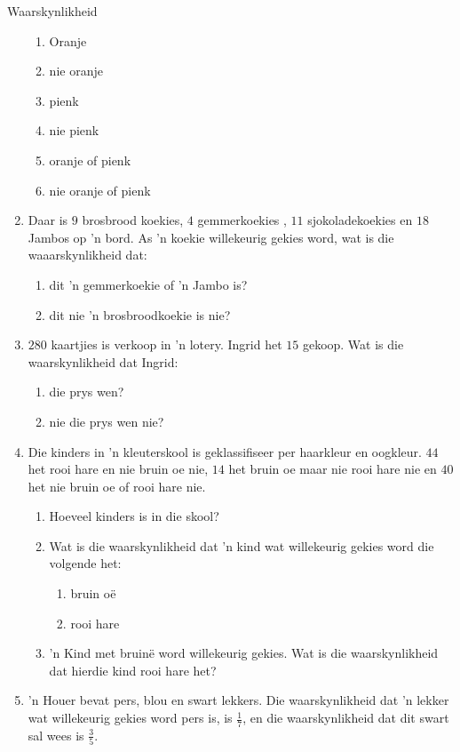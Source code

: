 \begin{eoexercises}{Waarskynlikheid}
\begin{enumerate}[itemsep=5pt, label=\textbf{\arabic*}]
    \begin{enumerate}
    \item Oranje
    \item nie oranje
    \item pienk
    \item nie pienk
    \item oranje of pienk
    \item nie oranje of pienk
    \end{enumerate}
  \item Daar is $9$ brosbrood koekies, $4$ gemmerkoekies ,
    $11$ sjokoladekoekies en $18$ Jambos op 'n bord. As 'n koekie willekeurig gekies word, wat is die waaarskynlikheid dat:
    \begin{enumerate}
    \item dit 'n gemmerkoekie of 'n Jambo is?
    \item dit nie 'n brosbroodkoekie is nie?
    \end{enumerate}
  \item $280$ kaartjies is verkoop in 'n lotery. Ingrid het $15$ gekoop. Wat is die waarskynlikheid dat Ingrid:
    \begin{enumerate}
    \item die prys wen?
    \item nie die prys wen nie?
    \end{enumerate}
  \item Die kinders in 'n kleuterskool is geklassifiseer per haarkleur en oogkleur. $44$ het rooi hare en nie bruin oe nie, $14$ het bruin oe maar nie rooi hare nie en $40$ het nie bruin oe of rooi hare nie.
    \begin{enumerate}
    \item Hoeveel kinders is in die skool?
    \item Wat is die waarskynlikheid dat 'n kind wat willekeurig gekies word die volgende het:
      \begin{enumerate}
      \item bruin o\"e
      \item rooi hare
      \end{enumerate} 
    \item 'n Kind met bruin\"e word willekeurig gekies. Wat is die waarskynlikheid dat hierdie kind rooi hare het?
    \end{enumerate}
  \item 'n Houer bevat pers, blou en swart lekkers. Die waarskynlikheid dat 'n lekker wat willekeurig gekies word pers is, is $\frac{1}{7}$, en die waarskynlikheid dat dit swart sal wees is $\frac{3}{5}$.

\end{enumerate}
\end{eoexercises}
